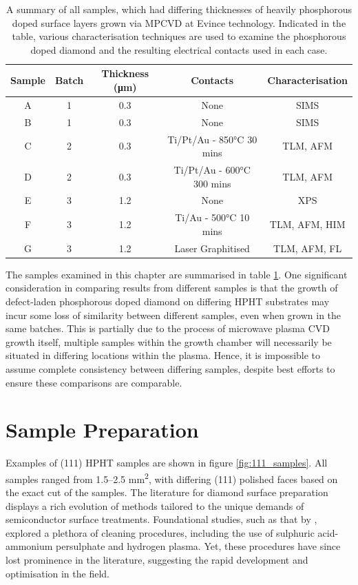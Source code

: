 \begin{table}[h]
\centering
\caption{A summary of all  samples, which had differing thicknesses of heavily phosphorous doped surface layers grown via MPCVD at Evince technology. Indicated in the table, various characterisation techniques are used to examine the phosphorous doped diamond and the resulting electrical contacts used in each case.}
\label{table:samples_summary}
\begin{tabular}{|c|c|c|c|c|}

\hline
Sample & Batch & Thickness (\si{\micro\metre}) & Contacts & Characterisation \\
\hline
A & 1 & 0.3 & None & SIMS \\
B & 1 & 0.3 & None & SIMS \\
C & 2 & 0.3 & Ti/Pt/Au - 850\si{\degreeCelsius} 30 mins  & TLM, AFM \\
D & 2 & 0.3 & Ti/Pt/Au - 600\si{\degreeCelsius} 300 mins & TLM, AFM \\
E & 3 & 1.2 & None & XPS \\
F & 3 & 1.2 & Ti/Au - 500\si{\degreeCelsius} 10 mins     & TLM, AFM, HIM \\
G & 3 & 1.2 & Laser Graphitised                          & TLM, AFM, FL \\
\hline
\end{tabular}
\end{table}

The samples examined in this chapter are summarised in table \ref{table:samples_summary}. One significant consideration in comparing results from different samples is that the growth of defect-laden phosphorous doped diamond on differing HPHT substrates may incur some loss of similarity between different samples, even when grown in the same batches. This is partially due to the process of microwave plasma CVD growth itself, multiple samples within the growth chamber will necessarily be situated in differing locations within the plasma. Hence, it is impossible to assume complete consistency between differing samples, despite best efforts to ensure these comparisons are comparable.

\section{Sample Preparation}
Examples of (111) HPHT samples are shown in figure \ref{fig:111_samples}. All samples ranged from 1.5--2.5 \si{\milli\metre\squared}, with differing (111) polished faces based on the exact cut of the samples. The literature for diamond surface preparation displays a rich evolution of methods tailored to the unique demands of semiconductor surface treatments. Foundational studies, such as that by \cite{baral1996}, explored a plethora of cleaning procedures, including the use of sulphuric acid-ammonium persulphate and hydrogen plasma. Yet, these procedures have since lost prominence in the literature, suggesting the rapid development and optimisation in the field.

